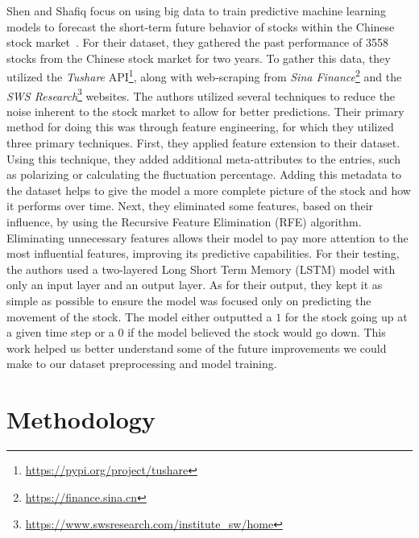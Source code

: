 \documentclass{ledger}
\begin{document}
%
Shen and Shafiq focus on using big data to train predictive machine learning models to forecast the short-term future behavior of stocks within the Chinese stock market~\cite{deepPrediction}. For their dataset, they gathered the past performance of 3558 stocks from the Chinese stock market for two years.
To gather this data, they utilized the \textit{Tushare} API\footnote{\url{https://pypi.org/project/tushare}}, along with web-scraping from \textit{Sina Finance}\footnote{\url{https://finance.sina.cn}} and the \textit{SWS Research}\footnote{\url{https://www.swsresearch.com/institute_sw/home}} websites.
The authors utilized several techniques to reduce the noise inherent to the stock market to allow for better predictions. Their primary method for doing this was through feature engineering, for which they utilized three primary techniques. First, they applied feature extension to their dataset. Using this technique, they added additional meta-attributes to the entries, such as polarizing or calculating the fluctuation percentage. Adding this metadata to the dataset helps to give the model a more complete picture of the stock and how it performs over time. Next, they eliminated some features, based on their influence, by using the Recursive Feature Elimination (RFE) algorithm. Eliminating unnecessary features allows their model to pay more attention to the most influential features, improving its predictive capabilities.
%
For their testing, the authors used a two-layered Long Short Term Memory (LSTM) model with only an input layer and an output layer. As for their output, they kept it as simple as possible to ensure the model was focused only on predicting the movement of the stock. The model either outputted a $1$ for the stock going up at a given time step or a $0$ if the model believed the stock would go down.
This work helped us better understand some of the future improvements we could make to our dataset preprocessing and model training.

\section{Methodology}
\end{document}
